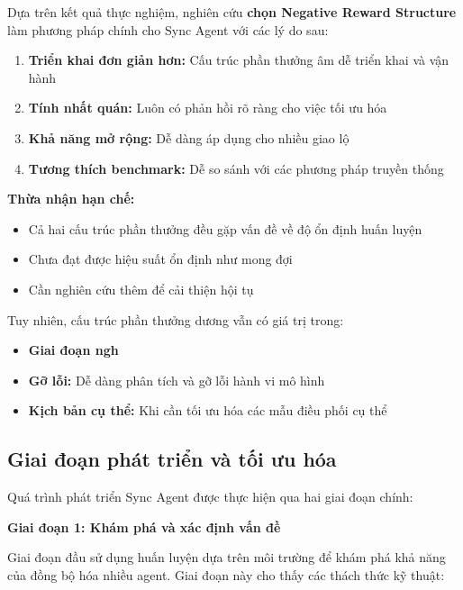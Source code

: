 Dựa trên kết quả thực nghiệm, nghiên cứu \textbf{chọn Negative Reward Structure}
làm phương pháp chính cho Sync Agent với các lý do sau:

\begin{enumerate}
    \item \textbf{Triển khai đơn giản hơn:} Cấu trúc phần thưởng âm dễ triển khai
        và vận hành
    \item \textbf{Tính nhất quán:} Luôn có phản hồi rõ ràng cho việc tối ưu hóa

    \item \textbf{Khả năng mở rộng:} Dễ dàng áp dụng cho nhiều giao lộ

    \item \textbf{Tương thích benchmark:} Dễ so sánh với các phương pháp
        truyền thống
\end{enumerate}

\textbf{Thừa nhận hạn chế:}
\begin{itemize}
    \item Cả hai cấu trúc phần thưởng đều gặp vấn đề về độ ổn định huấn luyện

    \item Chưa đạt được hiệu suất ổn định như mong đợi
    \item Cần nghiên cứu thêm để cải thiện hội tụ
\end{itemize}

Tuy nhiên, cấu trúc phần thưởng dương vẫn có giá trị trong:
\begin{itemize}
    \item \textbf{Giai đoạn ngh}

    \item \textbf{Gỡ lỗi:} Dễ dàng phân tích và gỡ lỗi hành vi mô hình

    \item \textbf{Kịch bản cụ thể:} Khi cần tối ưu hóa các mẫu điều phối cụ thể
\end{itemize}

\subsection{Giai đoạn phát triển và tối ưu hóa}

Quá trình phát triển Sync Agent được thực hiện qua hai giai đoạn chính:

\textbf{Giai đoạn 1: Khám phá và xác định vấn đề}

Giai đoạn đầu sử dụng huấn luyện dựa trên môi trường để khám phá khả năng của
đồng bộ hóa nhiều agent. Giai đoạn này cho thấy các thách thức kỹ thuật:


